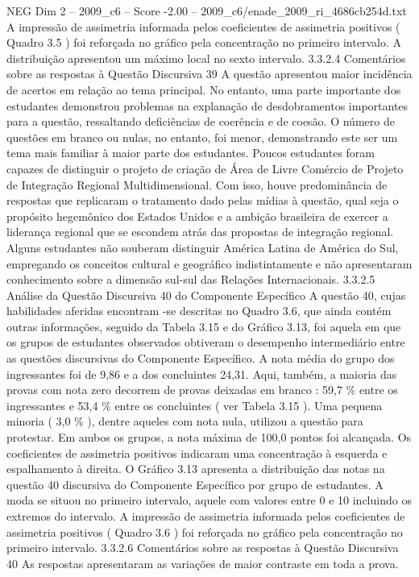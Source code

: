\begin{textsample}{NEG Dim 2 – 2009\_c6 – Score -2.00 – 2009\_c6/enade\_2009\_ri\_4686cb254d.txt}
A impressão de assimetria informada pelos coeficientes de assimetria positivos ( Quadro 3.5 ) foi reforçada no gráfico pela concentração no primeiro intervalo.
A distribuição apresentou um máximo local no sexto intervalo. 3.3.2.4 Comentários sobre as respostas à Questão Discursiva 39 A questão apresentou maior incidência de acertos em relação ao tema principal.
No entanto, uma parte importante dos estudantes demonstrou problemas na explanação de desdobramentos importantes para a questão, ressaltando deficiências de coerência e de coesão.
O número de questões em branco ou nulas, no entanto, foi menor, demonstrando este ser um tema mais familiar à maior parte dos estudantes.
Poucos estudantes foram capazes de distinguir o projeto de criação de Área de Livre Comércio de Projeto de Integração Regional Multidimensional.
Com isso, houve predominância de respostas que replicaram o tratamento dado pelas mídias à questão, qual seja o propósito hegemônico dos Estados Unidos e a ambição brasileira de exercer a liderança regional que se escondem atrás das propostas de integração regional.
Alguns estudantes não souberam distinguir América Latina de América do Sul, empregando os conceitos cultural e geográfico indistintamente e não apresentaram conhecimento sobre a dimensão sul-sul das Relações Internacionais. 3.3.2.5 Análise da Questão Discursiva 40 do Componente Específico A questão 40, cujas habilidades aferidas encontram -se descritas no Quadro 3.6, que ainda contém outras informações, seguido da Tabela 3.15 e do Gráfico 3.13, foi aquela em que os grupos de estudantes observados obtiveram o desempenho intermediário entre as questões discursivas do Componente Específico.
A nota média do grupo dos ingressantes foi de 9,86 e a dos concluintes 24,31.
Aqui, também, a maioria das provas com nota zero decorrem de provas deixadas em branco : 59,7 \% entre os ingressantes e 53,4 \% entre os concluintes ( ver Tabela 3.15 ).
Uma pequena minoria ( 3,0 \% ), dentre aqueles com nota nula, utilizou a questão para protestar.
Em ambos os grupos, a nota máxima de 100,0 pontos foi alcançada.
Os coeficientes de assimetria positivos indicaram uma concentração à esquerda e espalhamento à direita.
O Gráfico 3.13 apresenta a distribuição das notas na questão 40 discursiva do Componente Específico por grupo de estudantes.
A moda se situou no primeiro intervalo, aquele com valores entre 0 e 10 incluindo os extremos do intervalo.
A impressão de assimetria informada pelos coeficientes de assimetria positivos ( Quadro 3.6 ) foi reforçada no gráfico pela concentração no primeiro intervalo. 3.3.2.6 Comentários sobre as respostas à Questão Discursiva 40 As respostas apresentaram as variações de maior contraste em toda a prova.

\end{textsample}
